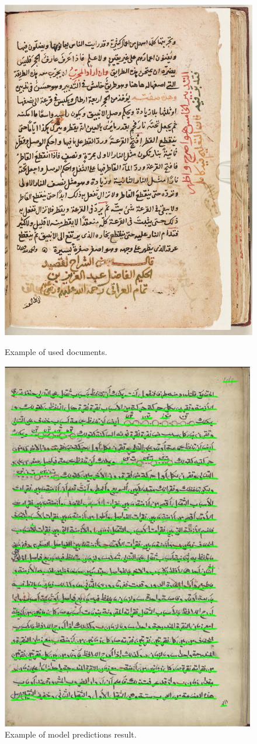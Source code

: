 \begin{figure}
    \centering
    \begin{minipage}{0.45\linewidth}
        \centering
        \includegraphics[width=0.7\linewidth, height=0.9\linewidth]{images/example.png} %
        \caption{Example of used documents.}
        \label{fig:example1}
    \end{minipage}\hfill
    \begin{minipage}{0.45\linewidth}
        \centering
        \includegraphics[width=0.7\linewidth, height=0.9\linewidth]{images/example2.png} %
        \caption{Example of model predictions result.}
        \label{fig:example2}
    \end{minipage}
\end{figure}

